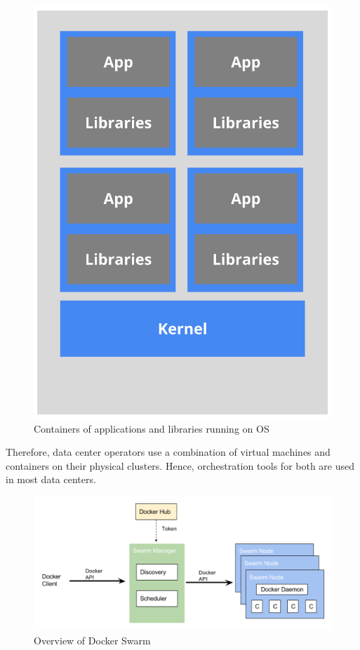 \documentclass[10pt,twocolumn]{article}
\begin{document}
\begin{figure}[thpb]
  \centering
      \includegraphics[width=\columnwidth]{container_app_libs}
    \caption{Containers of applications and libraries running on OS ~\cite{container_shared_lib}}
    \label{fig:container_app_libs}
\end{figure}

Therefore, data center operators use a combination of virtual machines and containers on their physical clusters.
Hence, orchestration tools for both are used in most data centers.

\begin{figure}
  \centering
    \includegraphics[width=\textwidth]{docker_swarm}
    \caption{Overview of Docker Swarm ~\cite{platform9_dockerswarm_kubernetes}}
  \label{overflow}
\end{figure}
\end{document}
